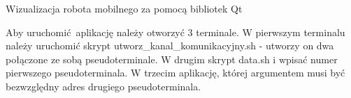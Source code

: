Wizualizacja robota mobilnego za pomocą bibliotek Qt

Aby uruchomić~aplikację należy otworzyć 3 terminale. W pierwszym terminalu należy uruchomić skrypt utworz\+\_\+kanal\+\_\+komunikacyjny.\+sh -\/ utworzy on dwa połączone ze sobą pseudoterminale. W drugim skrypt data.\+sh i wpisać numer pierwszego pseudoterminala. W trzecim aplikację, której argumentem musi być bezwzględny adres drugiego pseudoterminala. 
